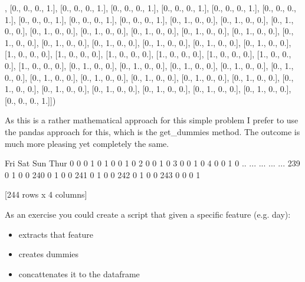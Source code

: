 \documentclass[letterpaper,10pt,english]{jupyterBook}
\begin{document}
\begin{sphinxVerbatim}[commandchars=\\\{\}]
        [0., 0., 0., 1.],
        [0., 0., 0., 1.],
        [0., 0., 0., 1.],
        [0., 0., 0., 1.],
        [0., 0., 0., 1.],
        [0., 0., 0., 1.],
        [0., 0., 0., 1.],
        [0., 0., 0., 1.],
        [0., 0., 0., 1.],
        [0., 0., 0., 1.],
        [0., 1., 0., 0.],
        [0., 1., 0., 0.],
        [0., 1., 0., 0.],
        [0., 1., 0., 0.],
        [0., 1., 0., 0.],
        [0., 1., 0., 0.],
        [0., 1., 0., 0.],
        [0., 1., 0., 0.],
        [0., 1., 0., 0.],
        [0., 1., 0., 0.],
        [0., 1., 0., 0.],
        [0., 1., 0., 0.],
        [0., 1., 0., 0.],
        [0., 1., 0., 0.],
        [1., 0., 0., 0.],
        [1., 0., 0., 0.],
        [1., 0., 0., 0.],
        [1., 0., 0., 0.],
        [1., 0., 0., 0.],
        [1., 0., 0., 0.],
        [1., 0., 0., 0.],
        [0., 1., 0., 0.],
        [0., 1., 0., 0.],
        [0., 1., 0., 0.],
        [0., 1., 0., 0.],
        [0., 1., 0., 0.],
        [0., 1., 0., 0.],
        [0., 1., 0., 0.],
        [0., 1., 0., 0.],
        [0., 1., 0., 0.],
        [0., 1., 0., 0.],
        [0., 1., 0., 0.],
        [0., 1., 0., 0.],
        [0., 1., 0., 0.],
        [0., 1., 0., 0.],
        [0., 1., 0., 0.],
        [0., 1., 0., 0.],
        [0., 0., 0., 1.]])
\end{sphinxVerbatim}

\sphinxAtStartPar
As this is a rather mathematical approach for this simple problem I prefer to use the pandas approach for this, which is the get\_dummies method.
The outcome is much more pleasing yet completely the same.

\begin{sphinxVerbatim}[commandchars=\\\{\}]
\end{sphinxVerbatim}

\begin{sphinxVerbatim}[commandchars=\\\{\}]
     Fri  Sat  Sun  Thur
0      0    0    1     0
1      0    0    1     0
2      0    0    1     0
3      0    0    1     0
4      0    0    1     0
..   ...  ...  ...   ...
239    0    1    0     0
240    0    1    0     0
241    0    1    0     0
242    0    1    0     0
243    0    0    0     1

[244 rows x 4 columns]
\end{sphinxVerbatim}

\sphinxAtStartPar
As an exercise you could create a script that given a specific feature (e.g. day):
\begin{itemize}
\item {} 
\sphinxAtStartPar
extracts that feature

\item {} 
\sphinxAtStartPar
creates dummies

\item {} 
\sphinxAtStartPar
concattenates it to the dataframe

\end{itemize}
\end{document}
